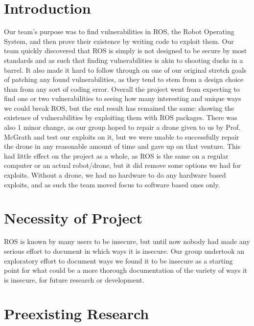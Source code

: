\documentclass[IEEEtran,letterpaper,10pt,notitlepage,draftclsnofoot,onecolumn]{article}
\begin{document}
\newpage
{}
\tableofcontents
\clearpage

\section{Introduction}
Our team’s purpose was to find vulnerabilities in ROS, the Robot Operating System, and then prove their existence by writing code to exploit them. 
Our team quickly discovered that ROS is simply is not designed to be secure by most standards and as such that finding vulnerabilities is akin to shooting ducks in a barrel. 
It also made it hard to follow through on one of our original stretch goals of patching any found vulnerabilities, as they tend to stem from a design choice than from any sort of coding error. 
Overall the project went from expecting to find one or two vulnerabilities to seeing how many interesting and unique ways we could break ROS, but the end result has remained the same: showing the existence of vulnerabilities by exploiting them with ROS packages. 
There was also 1 minor change, as our group hoped to repair a drone given to us by Prof. 
McGrath and test our exploits on it, but we were unable to successfully repair the drone in any reasonable amount of time and gave up on that venture. 
This had little effect on the project as a whole, as ROS is the same on a regular computer or an actual robot/drone, but it did remove some options we had for exploits. 
Without a drone, we had no hardware to do any hardware based exploits, and as such the team moved focus to software based ones only.

\section{Necessity of Project}
ROS is known by many users to be insecure, but until now nobody had made any serious effort to document in which ways it is insecure. 
Our group undertook an exploratory effort to document ways we found it to be insecure as a starting point for what could be a more thorough documentation of the variety of ways it is insecure, for future research or development. 

\section{Preexisting Research}
\end{document}
